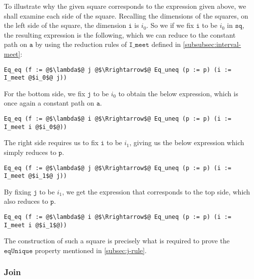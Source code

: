 \documentclass[12pt,twoside,maitrise]{dms}
\theoremstyle{definition}
\numberwithin{equation}{section}
\numberwithin{table}{chapter}
\numberwithin{figure}{chapter}
\newcommand\fn[1] {\texttt{#1}}
\begin{document}
To illustrate why the given square corresponds to the expression given above, we
shall examine each side of the square. Recalling the dimensions of the squares,
on the left side of the square, the dimension $\fn{i}$ is $i_0$. So we if we fix
$\fn{i}$ to be $i_0$ in $\fn{sq}$, the resulting expression is the following,
which we can reduce to the constant path on $\fn{a}$ by using the reduction
rules of $\fn{I\_meet}$ defined in \autoref{subsubsec:interval-meet}:


\begin{verbatim}
Eq_eq (f := @$\lambda$@ j @$\Rrightarrow$@ Eq_uneq (p := p) (i := I_meet @$i_0$@ j))
\end{verbatim}

For the bottom side, we fix $\fn{j}$ to be $i_0$ to obtain the below expression,
which is once again a constant path on $\fn{a}$.

\begin{verbatim}
Eq_eq (f := @$\lambda$@ i @$\Rrightarrow$@ Eq_uneq (p := p) (i := I_meet i @$i_0$@))
\end{verbatim}

The right side requires us to fix $\fn{i}$ to be $i_1$, giving us the below
expression which simply reduces to $\fn{p}$.

\begin{verbatim}
Eq_eq (f := @$\lambda$@ j @$\Rrightarrow$@ Eq_uneq (p := p) (i := I_meet @$i_1$@ j))
\end{verbatim}

By fixing $\fn{j}$ to be $i_1$, we get the expression that corresponds to the top side, which also reduces to $\fn{p}$.

\begin{verbatim}
Eq_eq (f := @$\lambda$@ i @$\Rrightarrow$@ Eq_uneq (p := p) (i := I_meet i @$i_1$@))
\end{verbatim}

The construction of such a square is precisely what is required to
prove the $\fn{eqUnique}$ property mentioned in \autoref{subsec:j-rule}.

\subsubsection*{Join}
\end{document}
